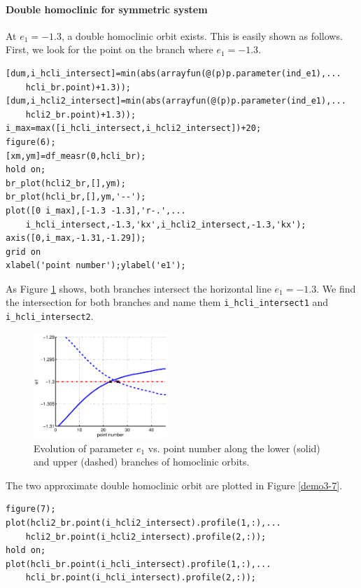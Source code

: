 \documentclass[10pt]{scrartcl}
\newcommand{\blist}[1]{\mbox{\lstinline!#1!}}
\begin{document}
{\paragraph{Double homoclinic for symmetric system}
At $e_{1}=-1.3$, a double homoclinic orbit exists.  This is easily
shown as follows. First, we look for the point on the branch where
$e_{1}=-1.3$.  
\begin{lstlisting}
[dum,i_hcli_intersect]=min(abs(arrayfun(@(p)p.parameter(ind_e1),...
    hcli_br.point)+1.3));
[dum,i_hcli2_intersect]=min(abs(arrayfun(@(p)p.parameter(ind_e1),...
    hcli2_br.point)+1.3));
i_max=max([i_hcli_intersect,i_hcli2_intersect])+20;
figure(6);
[xm,ym]=df_measr(0,hcli_br);
hold on;
br_plot(hcli2_br,[],ym);
br_plot(hcli_br,[],ym,'--');
plot([0 i_max],[-1.3 -1.3],'r-.',...
    i_hcli_intersect,-1.3,'kx',i_hcli2_intersect,-1.3,'kx');
axis([0,i_max,-1.31,-1.29]);
grid on
xlabel('point number');ylabel('e1');  
\end{lstlisting}
As Figure \ref{demo3-6} shows, both branches intersect the horizontal
line $e_1=-1.3$. We find the intersection for both branches and name
them \blist{i_hcli_intersect1} and \blist{i_hcli_intersect2}.
\begin{figure}[ht]
  \begin{center}
    \includegraphics[width=0.45\textwidth]{fig/hom_demfig06}
    \caption{\label{demo3-6}Evolution of parameter $e_1$ vs. point number
      along the lower (solid) and upper (dashed) branches of homoclinic orbits.}
  \end{center}
\end{figure}
The two approximate double homoclinic orbit are plotted in Figure
\ref{demo3-7}.
\begin{lstlisting}
figure(7);
plot(hcli2_br.point(i_hcli2_intersect).profile(1,:),...
    hcli2_br.point(i_hcli2_intersect).profile(2,:));
hold on;
plot(hcli_br.point(i_hcli_intersect).profile(1,:),...
    hcli_br.point(i_hcli_intersect).profile(2,:));  
\end{lstlisting}
\begin{figure}[ht]

\end{figure}}
\end{document}
